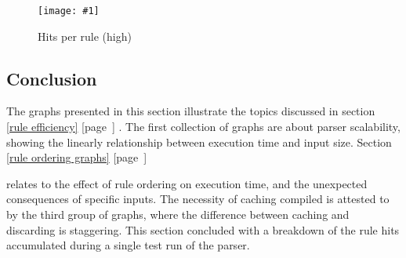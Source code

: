 \documentclass[a4paper,12pt,draft]{article}
\newcommand{\showgraph}[3]{
    \begin{figure}[hbt!]
        \caption{#2}\label{#3}
        \texttt{[image: \#1]}
    \end{figure}
}
\newcommand{\refwithpage}[1]{%
    \empty{}\ref{#1} [page~\pageref{#1}]%
}
\begin{document}
\showgraph{build/plot-hits-high.ps}{Hits per rule (high)}{hits per rule
high}

\clearpage

\subsection{Conclusion}

The graphs presented in this section illustrate the topics discussed in
section~\refwithpage{rule efficiency}.  The first collection of graphs are
about parser scalability, showing the linearly relationship between
execution time and input size.  Section~\refwithpage{rule ordering graphs}
relates to the effect of rule ordering on execution time, and the
unexpected consequences of specific inputs.  The necessity of caching
compiled \regexs{} is attested to by the third group of graphs, where the
difference between caching and discarding is staggering.  This section
concluded with a breakdown of the rule hits accumulated during a single
test run of the parser.


\renewcommand{\glossarytitle}{\section{Glossary}\label{Glossary}}
\printglossary{}
\renewcommand{\glossarytitle}{\section{Acronyms}\label{Acronyms}}
\printacronym{}

\end{document}
